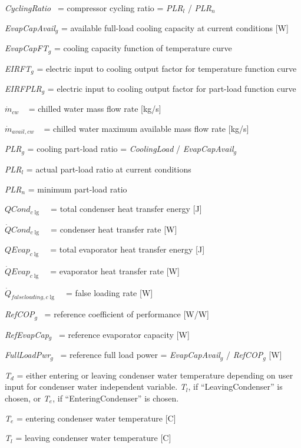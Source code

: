 \emph{CyclingRatio}~ = compressor cycling ratio = \emph{PLR\(_{l}\)} / \emph{PLR\(_{n}\)}

\emph{EvapCapAvail\(_{g}\)} = available full-load cooling capacity at current conditions {[}W{]}

\emph{EvapCapFT\(_{g}\)} = cooling capacity function of temperature curve

\emph{EIRFT\(_{g}\)} = electric input to cooling output factor for temperature function curve

\emph{EIRFPLR\(_{g}\)} = electric input to cooling output factor for part-load function curve

\({\dot m_{cw}}\) ~ = chilled water mass flow rate {[}kg/s{]}

\({\dot m_{avail,cw}}\) ~ = chilled water maximum available mass flow rate {[}kg/s{]}

\emph{PLR\(_{g}\)} = cooling part-load ratio = \emph{CoolingLoad} / \emph{EvapCapAvail\(_{g}\)}

\emph{PLR\(_{l}\)} = actual part-load ratio at current conditions

\emph{PLR\(_{n}\)} = minimum part-load ratio

\(QCon{d_{c\lg }}\) ~ = total condenser heat transfer energy {[}J{]}

\(\dot QCon{d_{c\lg }}\) ~ = condenser heat transfer rate {[}W{]}

\(QEva{p_{c\lg }}\) ~ = total evaporator heat transfer energy {[}J{]}

\(\dot QEva{p_{c\lg }}\) ~ = evaporator heat transfer rate {[}W{]}

\({\dot Q_{falseloading,c\lg }}\) ~ = false loading rate {[}W{]}

\emph{RefCOP\(_{g}\)}~ = reference coefficient of performance {[}W/W{]}

\emph{RefEvapCap\(_{g}\)}~ = reference evaporator capacity {[}W{]}

\emph{FullLoadPwr\(_{g}\)}~ = reference full load power = \emph{EvapCapAvail\(_{g}\)} / \emph{RefCOP\(_{g}\)} {[}W{]}

\emph{T\(_{d}\)} = either entering or leaving condenser water temperature depending on user input for condenser water independent variable. \emph{T\(_{l}\)}, if ``LeavingCondenser'' is chosen, or \emph{T\(_{e}\)}, if ``EnteringCondenser'' is chosen.

\emph{T\(_{e}\)} = entering condenser water temperature {[}C{]}

\emph{T\(_{l}\)} = leaving condenser water temperature {[}C{]}

